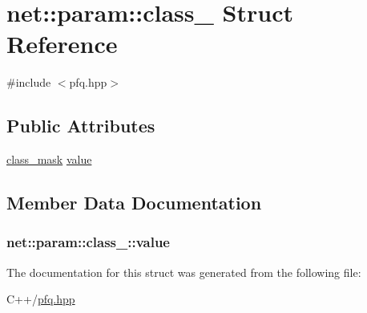 \hypertarget{structnet_1_1param_1_1class__}{\section{net\+:\+:param\+:\+:class\+\_\+ Struct Reference}
\label{structnet_1_1param_1_1class__}
}


{\ttfamily \#include $<$pfq.\+hpp$>$}

\subsection*{Public Attributes}
\begin{DoxyCompactItemize}
\item 
\hyperlink{namespacenet_a1dbd93552dc6ef6fbb0bb79d43ca22fd}{class\+\_\+mask} \hyperlink{structnet_1_1param_1_1class___a0662bf5d26b377299339f531f293fa9b}{value}
\end{DoxyCompactItemize}


\subsection{Member Data Documentation}
\hypertarget{structnet_1_1param_1_1class___a0662bf5d26b377299339f531f293fa9b}{
\subsubsection[{value}]{ net\+::param\+::class\+\_\+\+::value}}\label{structnet_1_1param_1_1class___a0662bf5d26b377299339f531f293fa9b}


The documentation for this struct was generated from the following file\+:\begin{DoxyCompactItemize}
\item 
C++/\hyperlink{pfq_8hpp}{pfq.\+hpp}\end{DoxyCompactItemize}
